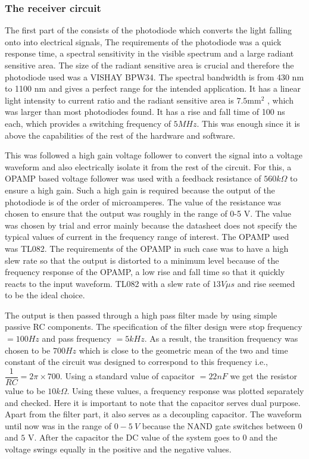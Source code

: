 \documentclass{article}
\begin{document}
\subsubsection{The receiver circuit}
The first part of the consists of the photodiode which converts the light falling onto into electrical signals, The requirements of the photodiode was a quick response time, a spectral sensitivity in the visible spectrum and a large radiant sensitive area. The size of the
radiant sensitive area is crucial and therefore the photodiode used was a VISHAY BPW34. The spectral bandwidth is from 430 nm to 1100 nm and gives a perfect range for the intended application. It has a linear light intensity to current ratio and the radiant sensitive area is $7.5 \text{mm}^2$ , which was larger than most photodiodes found. It has a rise
and fall time of 100 ns each, which provides a switching frequency of $5 MHz$. This was enough since it is above the capabilities of the rest of the hardware and software.

This was followed a high gain voltage follower to convert the signal into a voltage waveform and also electrically isolate it from the rest of the circuit. For this, a OPAMP based voltage follower was used with a feedback resistance of $560 k \Omega$ to ensure a high gain. Such a high gain is required because the output of the photodiode is of the order of microamperes. The value of the resistance was chosen to ensure that the output was roughly in the range of 0-5 V. The value was chosen by trial and error mainly because the datasheet does not specify the typical values of current in the frequency range of interest. The OPAMP used was TL082. The requirements of the OPAMP in such case was to have a high slew rate so that the output is distorted to a minimum level because of the frequency response of the OPAMP, a low rise and fall time so that it quickly reacts to the input waveform. TL082 with a slew rate of $13 V\mu s$ and rise  seemed to be the ideal choice.

The output is then passed through a high pass filter made by using simple passive RC components. The specification of the filter design were stop frequency $ = 100 Hz$ and pass frequency $ = 5 kHz $. As a result, the transition frequency was chosen to be $ 700 Hz $ which is close to the geometric mean of the two and time constant of the circuit was designed to correspond to this frequency i.e., $ \dfrac{1}{RC} = 2 \pi \times 700 $. Using a standard value of capacitor $ =  22 nF $ we get the resistor value to be $ 10 k \Omega $. Using these values, a frequency response was plotted separately and checked. Here it is important to note that the capacitor serves dual purpose. Apart from the filter part, it also serves as a decoupling capacitor. The waveform until now was in the range of $ 0-5 \  V $ because the NAND gate switches between $0$ and $5$ V. After the capacitor the DC value of the system goes to $0$ and the voltage swings equally in the positive and the negative values.
\end{document}
